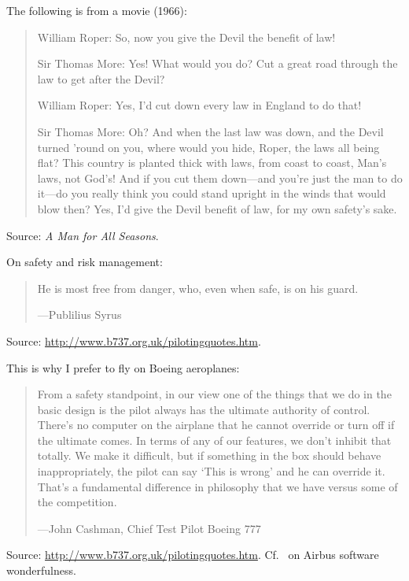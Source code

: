 \documentclass[a4paper]{article}
\begin{document}
The following is from a movie (1966):
\begin{quotation}
	William Roper: So, now you give the Devil the benefit of law! 

	Sir Thomas More: Yes! What would you do?  Cut a great road
		through the law to get after the Devil?

	William Roper: Yes, I'd cut down every law in England to do that! 

	Sir Thomas More: Oh? And when the last law was down, and the
		Devil turned 'round on you, where would you hide, Roper, the
		laws all being flat?  This country is planted thick with laws,
		from coast to coast, Man's laws, not God's!  And if you cut
		them down---and you're just the man to do it---do you really
		think you could stand upright in the winds that would blow then?
		Yes, I'd give the Devil benefit of law, for my own safety's sake.
\end{quotation}
Source: \emph{A Man for All Seasons}.
\medskip

On safety and risk management:
\begin{quote}
	He is most free from danger, who, even when safe, is on his guard.

	---Publilius Syrus
\end{quote}
Source: \url{http://www.b737.org.uk/pilotingquotes.htm}.
\medskip

This is why I prefer to fly on Boeing aeroplanes:
\begin{quote}
	From a safety standpoint, in our view one of the things that we do
	in the basic design is the pilot always has the ultimate authority
	of control.  There's no computer on the airplane that he cannot
	override or turn off if the ultimate comes.  In terms of any of our
	features, we don't inhibit that totally.  We make it difficult,
	but if something in the box should behave inappropriately,
	the pilot can say `This is wrong' and he can override it.  That's
	a fundamental difference in philosophy that we have versus some
	of the competition.

	---John Cashman, Chief Test Pilot Boeing 777
\end{quote}
Source: \url{http://www.b737.org.uk/pilotingquotes.htm}.
Cf.\ \citet{Anon2007} on Airbus software wonderfulness.
\medskip
\end{document}
